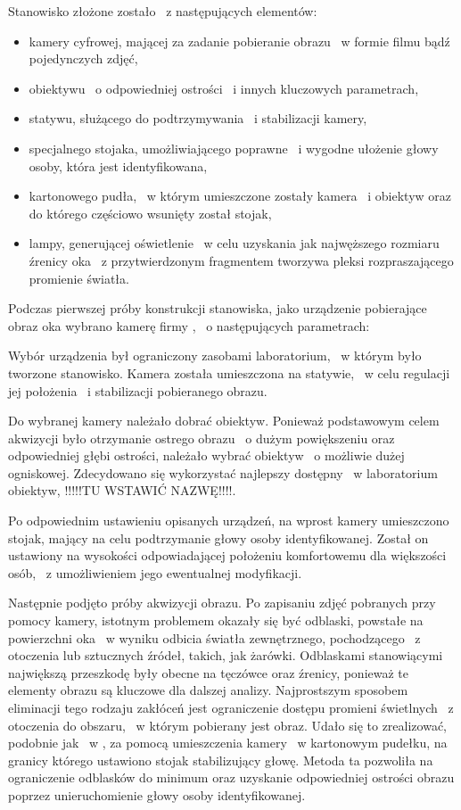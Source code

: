 Stanowisko złożone zostało ~z następujących elementów:
\begin{itemize}
 \item kamery cyfrowej, mającej za zadanie pobieranie obrazu ~w formie filmu bądź pojedynczych zdjęć,
 \item obiektywu ~o odpowiedniej ostrości ~i innych kluczowych parametrach,
 \item statywu, służącego do podtrzymywania ~i stabilizacji kamery,
 \item specjalnego stojaka, umożliwiającego poprawne ~i wygodne ułożenie głowy osoby, która jest identyfikowana,
 \item kartonowego pudła, ~w którym umieszczone zostały kamera ~i obiektyw oraz do którego częściowo wsunięty został stojak,
 \item lampy, generującej oświetlenie ~w celu uzyskania jak najwęższego rozmiaru źrenicy oka ~z przytwierdzonym fragmentem tworzywa pleksi rozpraszającego promienie światła.
 \end{itemize}

Podczas pierwszej próby konstrukcji stanowiska, jako urządzenie pobierające obraz oka wybrano kamerę firmy , ~o następujących parametrach:

Wybór urządzenia był ograniczony zasobami laboratorium, ~w którym było tworzone stanowisko. Kamera została umieszczona na statywie, ~w celu regulacji jej położenia ~i stabilizacji pobieranego obrazu.

Do wybranej kamery należało dobrać obiektyw. Ponieważ podstawowym celem akwizycji było otrzymanie ostrego obrazu ~o dużym powiększeniu oraz odpowiedniej głębi ostrości, należało wybrać obiektyw ~o możliwie dużej ogniskowej. Zdecydowano się wykorzystać najlepszy dostępny ~w laboratorium obiektyw, !!!!!TU WSTAWIĆ NAZWĘ!!!!.

Po odpowiednim ustawieniu opisanych urządzeń, na wprost kamery umieszczono stojak, mający na celu podtrzymanie głowy osoby identyfikowanej. Został on ustawiony na wysokości odpowiadającej położeniu komfortowemu dla większości osób, ~z umożliwieniem jego ewentualnej modyfikacji.

Następnie podjęto próby akwizycji obrazu. Po zapisaniu zdjęć pobranych przy pomocy kamery, istotnym problemem okazały się być odblaski, powstałe na powierzchni oka ~w wyniku odbicia światła zewnętrznego, pochodzącego ~z otoczenia lub sztucznych źródeł, takich, jak żarówki. Odblaskami stanowiącymi największą przeszkodę były obecne na tęczówce oraz źrenicy, ponieważ te elementy obrazu są kluczowe dla dalszej analizy. Najprostszym sposobem eliminacji tego rodzaju zakłóceń jest ograniczenie dostępu promieni świetlnych ~z otoczenia do obszaru, ~w którym pobierany jest obraz. Udało się to zrealizować, podobnie jak ~w \cite{Gl11}, za pomocą umieszczenia kamery ~w kartonowym pudełku, na granicy którego ustawiono stojak stabilizujący głowę. Metoda ta pozwoliła na ograniczenie odblasków do minimum oraz uzyskanie odpowiedniej ostrości obrazu poprzez unieruchomienie głowy osoby identyfikowanej.

